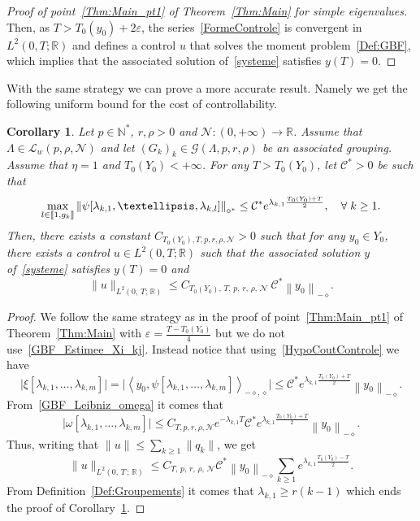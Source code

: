 \documentclass[11pt]{article}
\newtheorem{coro}[theo]{Corollary}
\theoremstyle{definition}
\numberwithin{equation}{section}
\numberwithin{figure}{section}
\numberwithin{table}{section}
\newcommand{\llbracket}{\mathopen{[\mkern -2.7mu[}}
\newcommand{\rrbracket}{\mathclose{]\mkern -2.7mu]}}
\newcommand{\inter}[2]{\llbracket #1,#2 \rrbracket}
\newcommand{\Fzp}{Y_0}
\newcommand{\normeXalphas}[1]{\left\| #1 \right\|_{\diamond^*}}
\newcommand{\normeXmalpha}[1]{\left\| #1 \right\|_{-\diamond}}
\newcommand{\dual}[2]{\left\langle #1, #2 \right\rangle_{-\diamond,\diamond}}
\newcommand{\n}{g}
\newcommand{\LL}{\mathcal{L}}
\newcommand{\NN}{\mathcal{N}}
\newcommand{\N}{\mathbb{N}}
\newcommand{\R}{\mathbb{R}}
\let\oldforall\forall
\renewcommand*{\forall}{\mathrel{\oldforall}}
\begin{document}
\begin{proof}[Proof of point~\eqref{Thm:Main_pt1} of Theorem~\ref{Thm:Main} for simple eigenvalues]
Then, as $T>T_0(y_0) + 2 \varepsilon$, the series~\eqref{FormeControle} is convergent in $L^2(0,T ; \R)$ and defines a control $u$ that solves the moment problem~\eqref{Def:GBF}, which implies that the associated solution of~\eqref{systeme} satisfies $y(T)=0$.
\end{proof}



With the same strategy we can prove a more accurate result. Namely we get the following uniform bound for the cost of controllability.
\begin{coro} \label{Coro:CoutControle}
Let $p \in \N^*$, $r, \rho > 0$ and $\NN : (0,+\infty) \to \R$. Assume that $\Lambda \in \LL_w(p,\rho, \NN)$ and let $(G_k)_k\in \mathcal{G}(\Lambda,p,r,\rho)$ be an associated grouping. Assume that $\eta=1$ and $T_0(\Fzp) < +\infty$. For any $T>T_0(\Fzp)$, let $\mathcal{C}^*>0 $ be such that
\begin{equation}\label{HypoCoutControle}
\max_{l \in \inter{1}{\n_k}} \normeXalphas{\psi[\lambda_{k,1}, \dots, \lambda_{k,l}]} \leq \mathcal{C}^* e^{\lambda_{k,1} \frac{T_0(\Fzp)+T}{2}}, \quad \forall k \geq 1.
\end{equation}
Then, there exists a constant $C_{T_0(\Fzp),T,p,r,\rho, \NN}>0$ such that for any $y_0 \in \Fzp$, there exists a control $u \in L^2(0,T ; \R)$ such that the associated solution $y$ of~\eqref{systeme} satisfies $y(T) = 0$ and
\[
\| u \|_{L^2(0,\,T;\,\R)} \leq C_{T_0(\Fzp),\,T,\,p,\,r,\,\rho,\,\NN}\ \mathcal{C}^* \normeXmalpha{ y_0 }.
\]
\end{coro}

\begin{proof}
We follow the same strategy as in the proof of point~\eqref{Thm:Main_pt1} of Theorem~\ref{Thm:Main} with $\varepsilon = \frac{T-T_0(\Fzp)}{4}$ but we do not use~\eqref{GBF_Estimee_Xi_kj}. Instead notice that using~\eqref{HypoCoutControle} we have
\[
\big| \xi[\lambda_{k,1}, \dots, \lambda_{k,m}] \big| = \big| \dual{ y_0}{ \psi[\lambda_{k,1}, \dots, \lambda_{k,m}]} \big|
\leq \mathcal{C}^* e^{\lambda_{k,1} \frac{T_0(\Fzp)+T}{2}} \normeXmalpha{ y_0 }.
\]
From~\eqref{GBF_Leibniz_omega} it comes that
\[
\big| \omega[\lambda_{k,1}, \dots, \lambda_{k,m}] \big| \leq C_{T,p,r,\rho,\NN} e^{-\lambda_{k,1} T} \mathcal{C}^* e^{\lambda_{k,1} \frac{T_0(\Fzp)+T}{2}} \normeXmalpha{ y_0}.
\]
Thus, writing that $\|u\|\leq \sum_{k\geq 1} \|q_k\|$, we get
\begin{equation*}
\| u \|_{L^2(0,\,T\,;\,\R)}
\leq C_{T,\,p,\,r,\,\rho,\,\NN} \mathcal{C}^* \normeXmalpha{ y_0 } \sum_{k \geq 1} e^{\lambda_{k,1} \frac{T_0(\Fzp)-T}{2}}.
\end{equation*}
From Definition~\ref{Def:Groupements} it comes that $\lambda_{k,1} \geq r (k-1)$ which ends the proof of Corollary~\ref{Coro:CoutControle}.
\end{proof}
\end{document}
